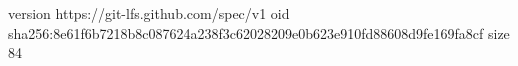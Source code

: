 version https://git-lfs.github.com/spec/v1
oid sha256:8e61f6b7218b8c087624a238f3c62028209e0b623e910fd88608d9fe169fa8cf
size 84
